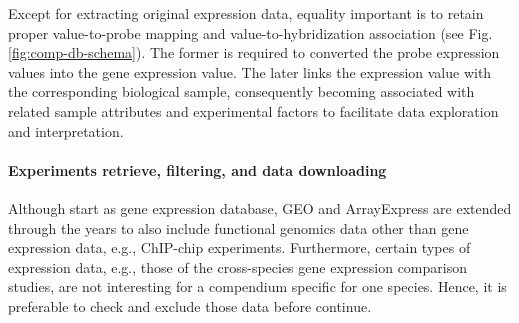 %
Except for extracting original expression data, equality important is to retain
proper value-to-probe mapping and value-to-hybridization association
(see Fig. \ref{fig:comp-db-schema}).
%
The former is required to converted the probe expression values into the gene
expression value.
%
The later links the expression value with the corresponding biological sample,
consequently becoming associated with related sample attributes and
experimental factors to facilitate data exploration and interpretation.



\paragraph{Experiments retrieve, filtering, and data downloading}

Although start as gene expression database, GEO and ArrayExpress are
extended through the years to also include functional genomics data
other than gene expression data, e.g., ChIP-chip experiments.
%
Furthermore, certain types of expression data, e.g., those of the
cross-species gene expression comparison studies, are not interesting
for a compendium specific for one species.
%
Hence, it is preferable to check and exclude those data before
continue.

